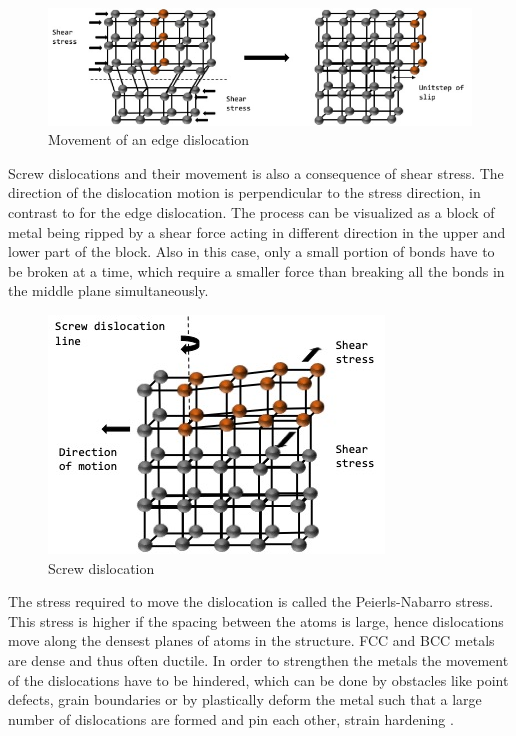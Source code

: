 \documentclass{article}
\begin{document}
\begin{figure}[h!]
    \includegraphics[width=\linewidth]{Edgedisl.jpg}
    \caption{Movement of an edge dislocation}
    \label{fig:Edge dislocation}

\end{figure}

Screw dislocations and their movement is also a consequence of shear stress. The direction of the dislocation motion is perpendicular to the stress direction, in contrast to for the edge dislocation. The process can be visualized as a block of metal being ripped by a shear force acting in different direction in the upper and lower part of the block. Also in this case, only a small portion of bonds have to be broken at a time, which require a smaller force than breaking all the bonds in the middle plane simultaneously. 
\begin{figure}[h!]
    \includegraphics[width=\linewidth]{Screwdis.jpg}
    \caption{Screw dislocation}
    \label{fig:Screw dislocation}

\end{figure}
The stress required to move the dislocation is called the Peierls-Nabarro stress. This stress is higher if the spacing between the atoms is large, hence dislocations move along the densest planes of atoms in the structure. FCC and BCC metals are dense and thus often ductile. In order to strengthen the metals the movement of the dislocations have to be hindered, which can be done by obstacles like point defects, grain boundaries or by plastically deform the metal such that a large number of dislocations are formed and pin each other, strain hardening \cite{Hardening}.
\end{document}
